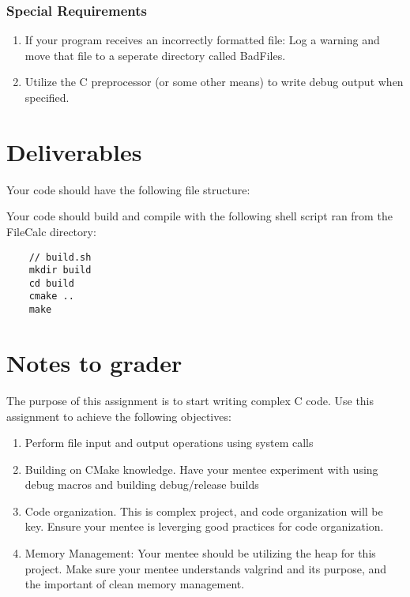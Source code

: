 \documentclass[letterpaper,12pt]{article}
\begin{document}
	\subsubsection{Special Requirements}
		\begin{enumerate}
			\item If your program receives an incorrectly formatted file: Log a warning and move that file to a seperate directory called BadFiles.
			\item Utilize the C preprocessor (or some other means) to write debug output when specified.
		\end{enumerate}
	\section{Deliverables}
	Your code should have the following file structure:
	\hfill

	Your code should build and compile with the following shell script ran from the FileCalc directory:

	\begin{lstlisting}
	// build.sh
	mkdir build
	cd build
	cmake .. 
	make
	\end{lstlisting}
	
	
	\section{Notes to grader}
	The purpose of this assignment is to start writing complex C code. Use this assignment to achieve the following objectives:
	\begin{enumerate}
		\item Perform file input and output operations using system calls
		\item Building on CMake knowledge. Have your mentee experiment with using debug macros and building debug/release builds
		\item Code organization. This is complex project, and code organization will be key. Ensure your mentee is leverging good practices for code organization.
		\item Memory Management: Your mentee should be utilizing the heap for this project. Make sure your mentee understands valgrind and its purpose, and the important of clean memory management. 
	\end{enumerate}
\end{document}

